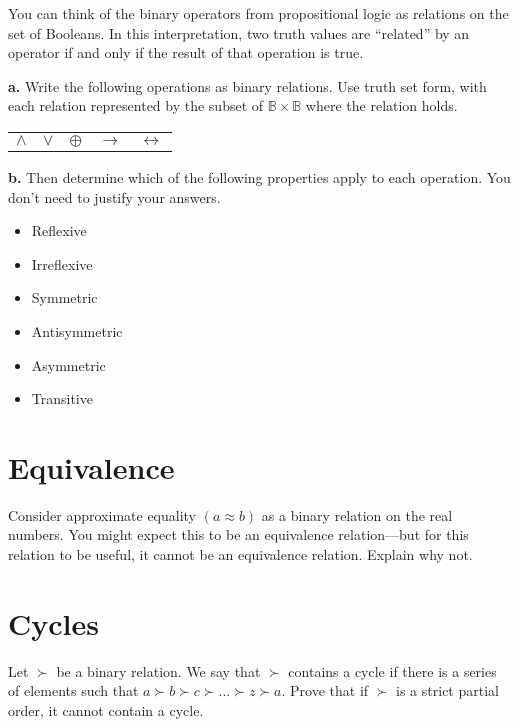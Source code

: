 \documentclass{article}
\begin{document}
You can think of the binary operators from propositional logic as relations on the set of Booleans.
In this interpretation, two truth values are ``related'' by an operator if and only if the result of that operation is true.
\vspace{1em}

\noindent
\textbf{a.}
Write the following operations as binary relations.
Use truth set form, with each relation represented by the subset of $\mathbb{B} \times \mathbb{B}$ where the relation holds.
\vspace{1em}

\begin{centering}
\begin{tabularx}{3in}{XXXXX}
    $\wedge$ & $\vee$ & $\oplus$ & $\rightarrow$ & $\leftrightarrow$ \\
\end{tabularx}\par
\end{centering}
\vspace{1em}

\noindent
\textbf{b.}
Then determine which of the following properties apply to each operation.
You don't need to justify your answers.

\begin{multicols}{3}
\begin{itemize}
    \item Reflexive
    \item Irreflexive
    \item Symmetric
    \item Antisymmetric
    \item Asymmetric
    \item Transitive
\end{itemize}
\end{multicols}


\section{Equivalence}

Consider approximate equality $(a \approx b)$ as a binary relation on the real numbers.
You might expect this to be an equivalence relation---but for this relation to be useful, it cannot be an equivalence relation.
Explain why not.


\section{Cycles}

Let $\succ$ be a binary relation.
We say that $\succ$ contains a cycle if there is a series of elements such that $a \succ b \succ c \succ ... \succ z \succ a$.
Prove that if $\succ$ is a strict partial order, it cannot contain a cycle.
\end{document}
